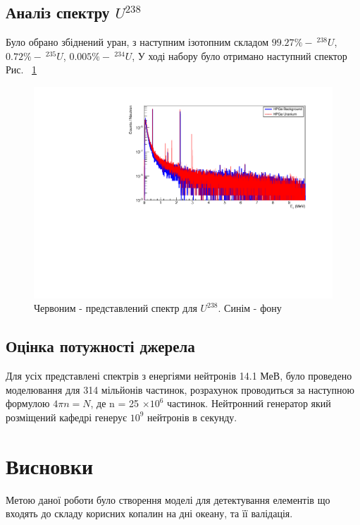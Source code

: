 \documentclass[a4paper, 14pt]{article}
\numberwithin{equation}{section}
\numberwithin{table}{section}
\begin{document}
\subsection{Аналіз спектру $U^{238}$}
Було обрано збіднений уран, з наступним ізотопним складом $99.27\% -\  ^{238}U$, $ 0.72\% - \  ^{235}U$, $ 0.005\% - \ ^{234}U$, У ході набору було отримано наступний спектор Рис. ~\ref{ris:poorU}
\begin{figure}[hbt!]
	\centering \includegraphics[width=1\textwidth]{res/poorUranium.pdf}
	\caption{Червоним - представлений спектр для $U^{238}$. Синім - фону} 
	\label{ris:poorU}	
\end{figure} 	
\subsection{Оцінка потужності джерела}
Для усіх представлені спектрів з енергіями нейтронів 14.1 МеВ, було проведено моделювання для 314 мільйонів частинок, розрахунок проводиться за наступною формулою $ 4 \pi n = N$, де n = 25 $\times 10^6$ частинок. Нейтронний генератор який розміщений кафедрі генерує $10^9$ нейтронів в секунду.
\newpage 
\section{Висновки}
\setcounter{figure}{0}
Метою даної роботи було створення моделі для детектування елементів що входять до складу корисних копалин на дні океану, та її валідація.
	
\end{document}
